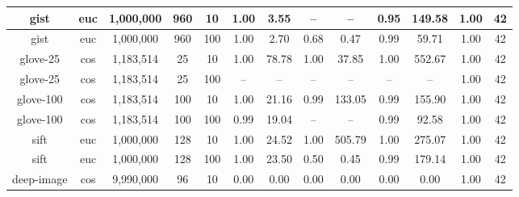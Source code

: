 \begin{table*}[!t]
\begin{center}
\begin{small}
\begin{sc}
\begin{tabular}{|c|c|c|c|c|c|c|c|c|c|c|c|c|}
    \hline 
    gist             & euc              & 1,000,000          & 960             & 10         & 1.00 & 3.55                           & -- & --                                     & 0.95 & 149.58                                                   & 1.00 & 42 \\
    \hline
    gist             & euc              & 1,000,000          & 960             & 100        & 1.00 & 2.70                           & 0.68 & 0.47                                 & 0.99 & 59.71                                                    & 1.00 & 42 \\
    \hline
    glove-25         & cos              & 1,183,514          & 25             & 10         & 1.00 & 78.78                          & 1.00 & 37.85                               & 1.00 & 552.67                                                  & 1.00 & 42 \\
    \hline
    glove-25         & cos              & 1,183,514          & 25             & 100        & -- & --                           & -- & --                                & -- & --                                                    & 1.00 & 42 \\
    \hline
    glove-100        & cos              & 1,183,514          & 100            & 10         & 1.00 & 21.16                          & 0.99 & 133.05                                & 0.99 & 155.90                                                  & 1.00 & 42 \\
    \hline
    glove-100        & cos              & 1,183,514          & 100            & 100        & 0.99 &  19.04                          & -- & --                                  & 0.99 & 92.58                                                    & 1.00 & 42 \\
    \hline
    sift             & euc              & 1,000,000          & 128            & 10         & 1.00 &  24.52                          & 1.00 & 505.79                               & 1.00 & 275.07                                                    & 1.00 & 42 \\
    \hline
    sift             & euc              & 1,000,000          & 128            & 100        & 1.00 &  23.50                          & 0.50 & 0.45                                  & 0.99 & 179.14                                                    & 1.00 & 42 \\
    \hline
    deep-image       & cos              & 9,990,000	         & 96             & 10          & 0.00 & 0.00                           & 0.00 & 0.00                                 & 0.00 & 0.00                                                     & 1.00 & 42 \\

\end{tabular}
\end{sc}
\end{small}
\end{center}
\end{table*}
